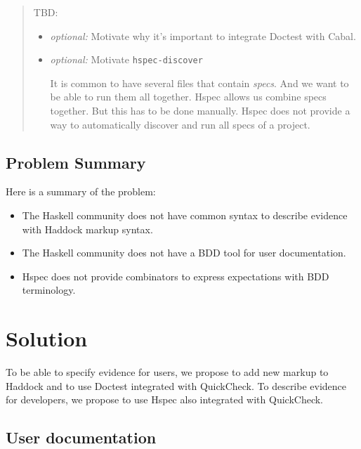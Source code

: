 \documentclass[preprint]{sigplanconf}
\begin{document}
\begin{quote}
    TBD:
\begin{itemize}
    \item \emph{optional:} Motivate why it's important to integrate
        Doctest with
        Cabal.

    \item \emph{optional:} Motivate \verb|hspec-discover|

        It is common to have several files that contain \emph{specs}.
        And we want to be able to run them all together.  Hspec allows
        us combine specs together.  But this has to be done manually.
        Hspec does not provide a way to automatically discover and run
        all specs of a project.
\end{itemize}
\end{quote}

\subsection{Problem Summary}

Here is a summary of the problem:

\begin{itemize}
\item
    The Haskell community does not have common syntax to describe
    evidence with Haddock markup syntax.
\item
    The Haskell community does not have a BDD tool for user documentation.
\item
    Hspec does not provide combinators to express expectations with
    BDD terminology.
\end{itemize}

\section{Solution}

To be able to specify evidence for users, we propose to add new
markup to Haddock and to use Doctest integrated with QuickCheck. To
describe evidence for developers, we propose to use Hspec also
integrated with QuickCheck.

\subsection{User documentation}
\label{sec:user-doc}
\end{document}
